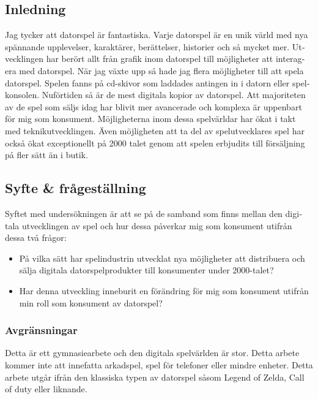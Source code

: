 \documentclass[11p]{article}
\begin{document}
    \begin{otherlanguage}{swedish}
        \section{Inledning}
        Jag tycker att datorspel är fantastiska.
        Varje datorspel är en unik värld med nya spännande upplevelser, karaktärer, berättelser, historier och så mycket mer.
        Utvecklingen har berört allt från grafik inom datorspel till möjligheter att interagera med datorspel.
        När jag växte upp så hade jag flera möjligheter till att spela datorspel.
        Spelen fanns på cd-skivor som laddades antingen in i datorn eller spelkonsolen.
        Nuförtiden så är de mest digitala kopior av datorspel.
        Att majoriteten av de spel som säljs idag har blivit mer avancerade och komplexa är uppenbart för mig som konsument.
        Möjligheterna inom dessa spelvärldar har ökat i takt med teknikutvecklingen.
        Även möjligheten att ta del av spelutvecklares spel har också ökat exceptionellt på 2000 talet genom att spelen erbjudits till försäljning på fler sätt än i butik.
        \subsection{Syfte \& frågeställning}

        Syftet med undersökningen är att se på de samband som finns mellan den digitala utvecklingen av spel och hur dessa påverkar mig som konsument utifrån dessa två frågor:

        \begin{itemize}

            \item På vilka sätt har spelindustrin utvecklat nya möjligheter att distribuera och sälja digitala datorspelprodukter till konsumenter under 2000-talet?

            \item Har denna utveckling inneburit en förändring för mig som konsument utifrån min roll som konsument av datorspel?

        \end{itemize}

        \subsubsection{Avgränsningar}
        Detta är ett gymnasiearbete och den digitala spelvärlden är stor.
        Detta arbete kommer inte att innefatta arkadspel, spel för telefoner eller mindre enheter.
        Detta arbete utgår ifrån den klassiska typen av datorspel såsom Legend of Zelda, Call of duty eller liknande.



\end{otherlanguage}
\end{document}
